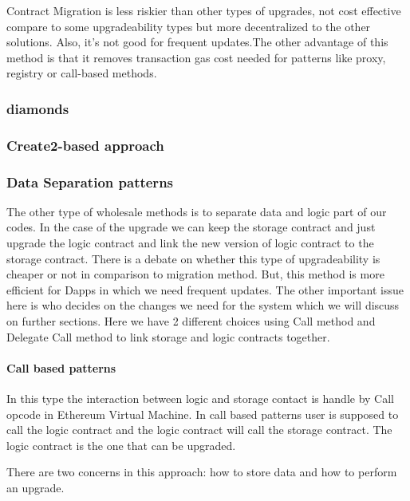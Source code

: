 Contract Migration is less riskier than other types of upgrades, not cost effective compare to some upgradeability types but more decentralized to the other solutions. Also, it's not good for frequent updates.The other advantage of this method is that it removes transaction gas cost needed for patterns like proxy, registry or call-based methods.



\subsubsection{diamonds}
\subsubsection{Create2-based approach}

\subsubsection{Data Separation patterns}
The other type of wholesale methods is to separate data and logic part of our codes. In the case of the upgrade we can  keep the storage contract and just upgrade the logic contract and link the new version of logic contract to the storage contract.
There is a debate on whether this type of upgradeability is cheaper or not in comparison to migration method. But, this method is more efficient for Dapps in which we need frequent updates. The other important issue here is who decides on the changes we need for the system which we will discuss on further sections.
Here we have 2 different choices using Call method and Delegate Call method to link storage and logic contracts together.

\paragraph{Call based patterns}

In this type the interaction between logic and storage contact is handle by Call opcode in Ethereum Virtual Machine. In call based patterns user is supposed to call the logic contract and the logic contract will call the storage contract. The logic contract is the one that can be upgraded.

There are two concerns in this approach: how to store data and how to perform an upgrade.

